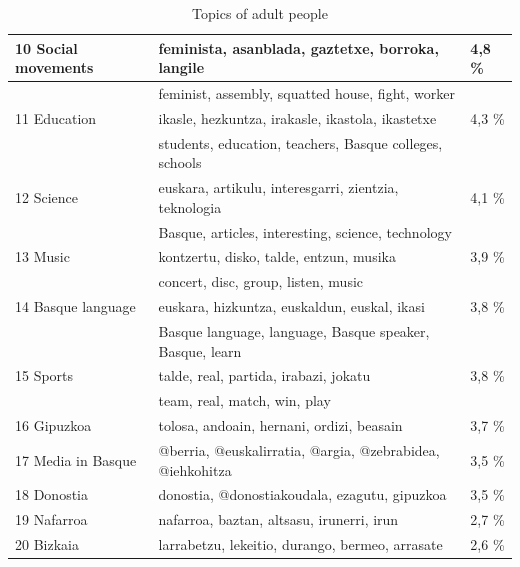\documentclass[information,article,submit,moreauthors,pdftex,10pt,a4paper]{Definitions/mdpi}
\begin{document}
\begin{table}[H]
\begin{tabular}{|l|l|l|}
                   10 Social movements & feminista, asanblada, gaztetxe, borroka, langile & 4,8 \%  \\ \hline
                   & feminist, assembly, squatted house, fight, worker & \\ \hline
                   11 Education & ikasle, hezkuntza, irakasle, ikastola, ikastetxe & 4,3 \%  \\ \hline
                   & students, education, teachers, Basque colleges, schools & \\ \hline
                   12 Science & euskara, artikulu, interesgarri, zientzia, teknologia & 4,1 \%  \\ \hline
                   &  Basque, articles, interesting, science, technology& \\ \hline
                   13 Music & kontzertu, disko, talde, entzun, musika & 3,9 \%  \\ \hline
                   & concert, disc, group, listen, music & \\ \hline
                   14 Basque language & euskara, hizkuntza, euskaldun, euskal, ikasi & 3,8 \%  \\ \hline
                   & Basque language, language, Basque speaker, Basque, learn & \\ \hline
                   15 Sports & talde, real, partida, irabazi, jokatu & 3,8 \%  \\ \hline
                   & team, real, match, win, play & \\ \hline
                   16 Gipuzkoa & tolosa, andoain, hernani, ordizi, beasain & 3,7 \%  \\ \hline
                   17 Media in Basque & @berria, @euskalirratia, @argia, @zebrabidea, @iehkohitza & 3,5 \%  \\ \hline
                   18 Donostia & donostia, @donostiakoudala, ezagutu, gipuzkoa & 3,5 \%  \\ \hline
                   19 Nafarroa & nafarroa, baztan, altsasu, irunerri, irun & 2,7 \%  \\ \hline
                   20 Bizkaia & larrabetzu, lekeitio, durango, bermeo, arrasate & 2,6 \%  \\ \hline
  \end{tabular}
  \caption{Topics of adult people}
  \label{tab:adult-tp}
\end{table}
\end{document}
